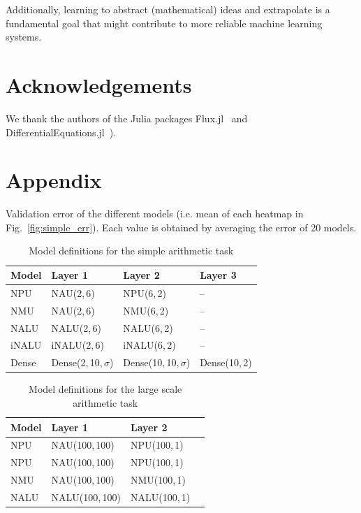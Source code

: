 \documentclass[9pt]{article}
\begin{document}
Additionally, learning to abstract (mathematical) ideas and extrapolate is a
fundamental goal that might contribute to more reliable machine learning
systems.

\section{Acknowledgements}%
\label{sec:acknowledgements}

We thank the authors of the Julia packages
Flux.jl~\citep{innes_fashionable_2018} and
DifferentialEquations.jl~\citep{rackauckas_differentialequationsjl_2017}).




\appendix
\section*{Appendix}%
\label{sec:appendix}

\setcounter{table}{0}
\renewcommand{\thetable}{A\arabic{table}}

\begin{table}[h]
  \centering
  \caption{Validation error of the different models (i.e. mean of each heatmap
  in Fig.~\ref{fig:simple_err}). Each value is obtained by averaging the error
  of 20 models.
  }
  \label{tab:simple_err}
  
\end{table}


\begin{table}[h]
  \centering
  \caption{Model definitions for the simple arithmetic task}
  \label{tab:models_simple_task}
  \begin{tabular}{llll}
    \toprule
    Model & Layer 1 & Layer 2 & Layer 3 \\
    \midrule
    NPU & NAU(2,\,6) & NPU(6,\,2) & -- \\
    NMU & NAU(2,\,6) & NMU(6,\,2) & -- \\
    NALU & NALU(2,\,6) & NALU(6,\,2) & -- \\
    iNALU & iNALU(2,\,6) & iNALU(6,\,2) & -- \\
    Dense & Dense(2,\,10,\,$\sigma$) & Dense(10,\,10,\,$\sigma$) & Dense(10,\,2) \\
    \bottomrule
  \end{tabular}
\end{table}

\begin{table}[h]
  \caption{Model definitions for the large scale arithmetic task}
  \label{tab:models_large_task}
  \begin{tabular}{llll}
    \toprule
    Model & Layer 1 & Layer 2\\
    \midrule
    NPU & NAU(100,\,100) & NPU(100,\,1) \\
    NPU & NAU(100,\,100) & NPU(100,\,1) \\
    NMU & NAU(100,\,100) & NMU(100,\,1) \\
    NALU & NALU(100,\,100) & NALU(100,\,1) \\
    \bottomrule
  \end{tabular}
\end{table}
\end{document}
